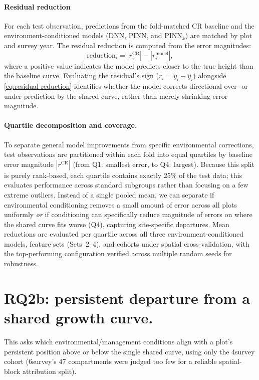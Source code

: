 \paragraph*{Residual reduction}
For each test observation, predictions from the fold-matched CR baseline and the environment-conditioned models (DNN, PINN, and PINN$_k$) are matched by plot and survey year. The residual reduction is computed from the error magnitudes:
\begin{equation}
\text{reduction}_i = \left|r_i^{\text{CR}}\right| - \left|r_i^{\text{model}}\right|,
\label{eq:residual-reduction}
\end{equation}
where a positive value indicates the model predicts closer to the true height than the baseline curve. Evaluating the residual's sign ($r_i = y_i - \hat{y}_i$) alongside \eqref{eq:residual-reduction} identifies whether the model corrects directional over- or under-prediction by the shared curve, rather than merely shrinking error magnitude. 

\paragraph*{Quartile decomposition and coverage.} To separate general model improvements from specific environmental corrections, test observations are partitioned within each fold into equal quartiles by baseline error magnitude $|r^{\text{CR}}|$ (from Q1: smallest error, to Q4: largest). Because this split is purely rank-based, each quartile contains exactly 25\% of the test data; this evaluates performance across standard subgroups rather than focusing on a few extreme outliers. Instead of a single pooled mean, we can separate if environmental conditioning removes a small amount of error across all plots uniformly \textit{or} if conditioning can specifically reduce magnitude of errors on where the shared curve fits worse (Q4), capturing site-specific departures. Mean reductions are evaluated per quartile across all three environment-conditioned models, feature sets (Sets~2--4), and cohorts under spatial cross-validation, with the top-performing configuration verified across multiple random seeds for robustness. %

\section*{RQ2b: persistent departure from a shared growth curve.}
This asks which environmental/management conditions align with a plot's persistent position above or below the single shared curve, using only the 4survey cohort (6survey's 47 compartments were judged too few for a reliable spatial-block attribution split).

